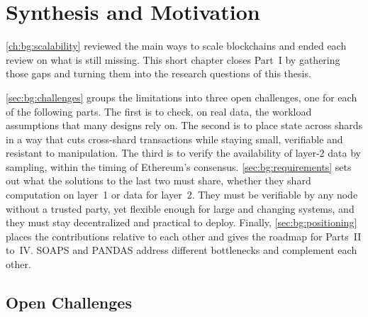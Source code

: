 \chapter{Synthesis and Motivation}\label{ch:bg:synthesis}


\autoref{ch:bg:scalability} reviewed the main ways to scale blockchains and ended each review on what is still missing.
This short chapter closes Part~I by gathering those gaps and turning them into the research questions of this thesis. 

\autoref{sec:bg:challenges} groups the limitations into three open challenges, one for each of the following parts.
The first is to check, on real data, the workload assumptions that many designs rely on.
The second is to place state across shards in a way that cuts cross-shard transactions while staying small, verifiable and resistant to manipulation.
The third is to verify the availability of layer-2 data by sampling, within the timing of Ethereum's consensus.
\autoref{sec:bg:requirements} sets out what the solutions to the last two must share, whether they shard computation on layer~1 or data for layer~2.
They must be verifiable by any node without a trusted party, yet flexible enough for large and changing systems, and they must stay decentralized and practical to deploy.
Finally, \autoref{sec:bg:positioning} places the contributions relative to each other and gives the roadmap for Parts~II to~IV.
SOAPS and PANDAS address different bottlenecks and complement each other.

\section{Open Challenges}\label{sec:bg:challenges}


